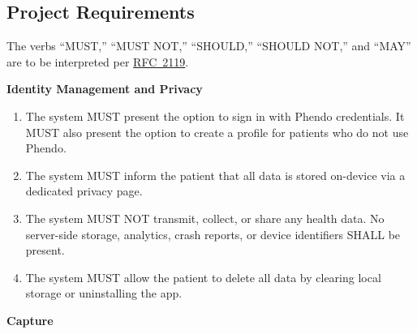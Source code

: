 \subsection{Project Requirements}
\label{sec:requirements}

\begingroup
\fontsize{10pt}{12pt}\selectfont
\ttfamily
\setlength{\parindent}{0pt}
\setlength{\parskip}{6pt}

The verbs ``MUST,'' ``MUST NOT,'' ``SHOULD,'' ``SHOULD NOT,'' and ``MAY'' are to be interpreted per \href{https://datatracker.ietf.org/doc/html/rfc2119}{RFC~2119}.

\textbf{Identity Management and Privacy}

\begin{enumerate}
  \item The system MUST present the option to sign in with Phendo credentials. It MUST also present the option to create a profile for patients who do not use Phendo.
  \item The system MUST inform the patient that all data is stored on-device via a dedicated privacy page.
  \item The system MUST NOT transmit, collect, or share any health data. No server-side storage, analytics, crash reports, or device identifiers SHALL be present.
  \item The system MUST allow the patient to delete all data by clearing local storage or uninstalling the app.
\end{enumerate}

\textbf{Capture}

